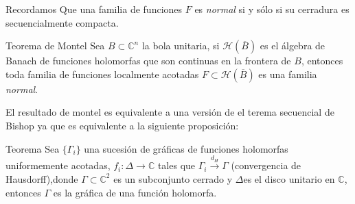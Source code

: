 \documentclass[letterpaper]{beamer}
\newcommand{\co}{\ensuremath{\mathbb C }}
\newcommand{\con}{\ensuremath{\mathbb{C}^n}}
\begin{document}
\begin{frame}
\begin{block}{Recordamos}
  Que una familia de funciones $F$ es \textit{normal} si y s\'olo si su cerradura es secuencialmente compacta.
\end{block}
\begin{block}{Teorema de Montel}\label{Montel}
        Sea $B\subset\con$ la bola unitaria, si $\mathcal{H}(\overline{B})$ es el \'algebra de Banach de funciones holomorfas que son continuas
        en la frontera de $B$, entonces toda familia de funciones localmente acotadas $F\subset\mathcal{H}(\overline{B})$ es una familia \textit{normal}.
      \end{block}
    \end{frame}
\begin{frame}
  El resultado de montel es equivalente a una versi\'on de el terema secuencial de Bishop ya que es equivalente a la siguiente proposici\'on:
\begin{block}{Teorema}
  Sea $\lbrace\Gamma_i\rbrace$ una sucesi\'on de gr\'aficas de funciones holomorfas uniformemente acotadas, $f_i:\Delta\rightarrow\co$ tales que
  $\Gamma_i\overset{d_H}\longrightarrow\Gamma$ (convergencia de Hausdorff),donde $\Gamma\subset\co^2$ es un subconjunto cerrado y $\Delta$es el disco unitario
    en $\co$, entonces $\Gamma$ es la gr\'afica de una funci\'on holomorfa.
\end{block}
\end{frame}
\end{document}
